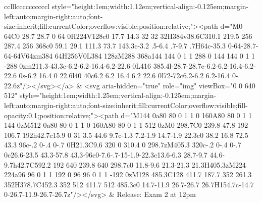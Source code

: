 \documentclass[
]{article}
\begin{document}
\begin{figure*}
\begin{longtable*}{cclllccccccccccl}
style="height:1em;width:1.12em;vertical-align:-0.125em;margin-left:auto;margin-right:auto;font-size:inherit;fill:currentColor;overflow:visible;position:relative;"><path d="M0 64C0 28.7 28.7 0 64 0H224V128c0 17.7 14.3 32 32 32H384v38.6C310.1 219.5 256 287.4 256 368c0 59.1 29.1 111.3 73.7 143.3c-3.2 .5-6.4 .7-9.7 .7H64c-35.3 0-64-28.7-64-64V64zm384 64H256V0L384 128zM288 368a144 144 0 1 1 288 0 144 144 0 1 1 -288 0zm211.3-43.3c-6.2-6.2-16.4-6.2-22.6 0L416 385.4l-28.7-28.7c-6.2-6.2-16.4-6.2-22.6 0s-6.2 16.4 0 22.6l40 40c6.2 6.2 16.4 6.2 22.6 0l72-72c6.2-6.2 6.2-16.4 0-22.6z"/></svg></a> & <svg aria-hidden="true" role="img" viewBox="0 0 640 512" style="height:1em;width:1.25em;vertical-align:-0.125em;margin-left:auto;margin-right:auto;font-size:inherit;fill:currentColor;overflow:visible;fill-opacity:0.1;position:relative;"><path d="M144 0a80 80 0 1 1 0 160A80 80 0 1 1 144 0zM512 0a80 80 0 1 1 0 160A80 80 0 1 1 512 0zM0 298.7C0 239.8 47.8 192 106.7 192h42.7c15.9 0 31 3.5 44.6 9.7c-1.3 7.2-1.9 14.7-1.9 22.3c0 38.2 16.8 72.5 43.3 96c-.2 0-.4 0-.7 0H21.3C9.6 320 0 310.4 0 298.7zM405.3 320c-.2 0-.4 0-.7 0c26.6-23.5 43.3-57.8 43.3-96c0-7.6-.7-15-1.9-22.3c13.6-6.3 28.7-9.7 44.6-9.7h42.7C592.2 192 640 239.8 640 298.7c0 11.8-9.6 21.3-21.3 21.3H405.3zM224 224a96 96 0 1 1 192 0 96 96 0 1 1 -192 0zM128 485.3C128 411.7 187.7 352 261.3 352H378.7C452.3 352 512 411.7 512 485.3c0 14.7-11.9 26.7-26.7 26.7H154.7c-14.7 0-26.7-11.9-26.7-26.7z"/></svg> & Release: Exam 2 at 12pm \\ 

\end{longtable*}
\end{figure*}
\end{document}
